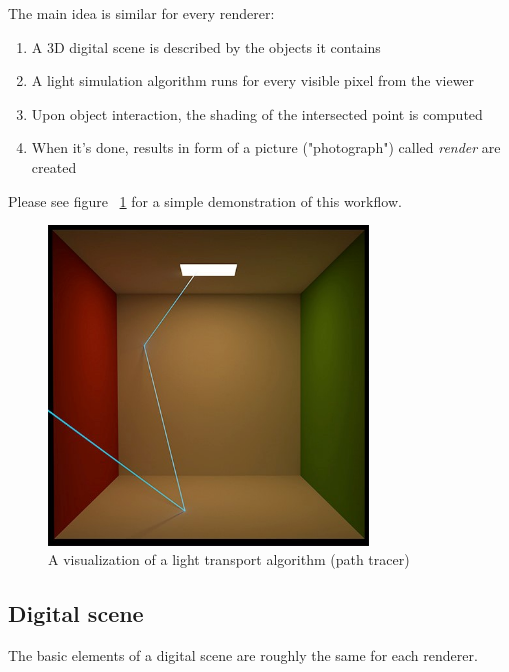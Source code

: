 The main idea is similar for every renderer:
\begin{enumerate}
	\item A 3D digital scene is described by the objects it contains
	\item A light simulation algorithm runs for every visible pixel from the viewer
	\item Upon object interaction, the shading of the intersected point is computed
	\item When it's done, results in form of a picture ("photograph") called \emph{render} are created
\end{enumerate}

Please see figure ~\ref{fig:path_tracer} for a simple demonstration of this workflow.

\begin{figure}[H]
	\centering
	\includegraphics[width=85mm]{img/path_tracer.jpg}
	\caption{A visualization of a light transport algorithm (path tracer)~\cite{mitsubaWeb}}
	\label{fig:path_tracer}
\end{figure}

\subsection{Digital scene}

The basic elements of a digital scene are roughly the same for each renderer. 


